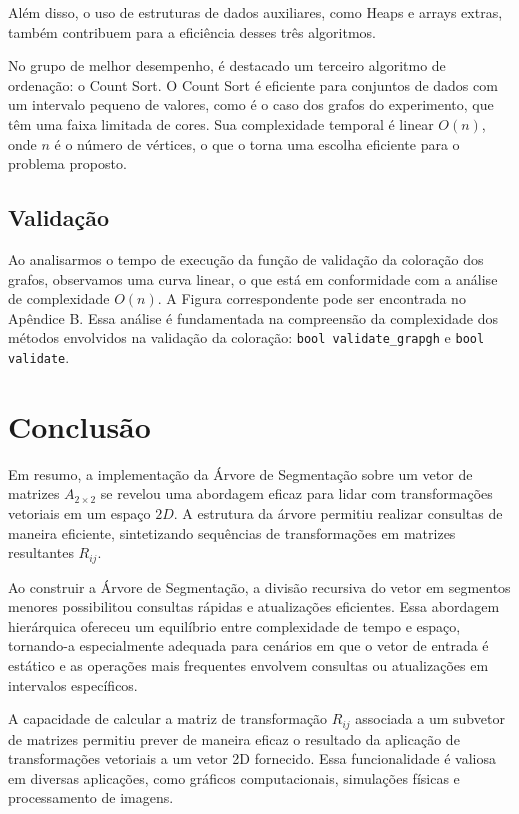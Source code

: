 \documentclass{article}
\begin{document}
Além disso, o uso de estruturas de dados auxiliares, como Heaps e arrays extras, também contribuem para a eficiência desses três algoritmos.

No grupo de melhor desempenho, é destacado um terceiro algoritmo de ordenação: o Count Sort. O Count Sort é eficiente para conjuntos de dados com um intervalo pequeno de valores, como é o caso dos grafos do experimento, que têm uma faixa limitada de cores. Sua complexidade temporal é linear \(O(n)\), onde \(n\) é o número de vértices, o que o torna uma escolha eficiente para o problema proposto.


\subsection{Validação}

Ao analisarmos o tempo de execução da função de validação da coloração dos grafos, observamos uma curva linear, o que está em conformidade com a análise de complexidade \(O(n)\). A Figura correspondente pode ser encontrada no Apêndice B.
Essa análise é fundamentada na compreensão da complexidade dos métodos envolvidos na validação da coloração: \texttt{bool validate\_grapgh} e \texttt{bool validate}.




\section{Conclusão}

Em resumo, a implementação da Árvore de Segmentação sobre um vetor de matrizes \(A_{2 \times 2}\) se revelou uma abordagem eficaz para lidar com transformações vetoriais em um espaço \(2D\). A estrutura da árvore permitiu realizar consultas de maneira eficiente, sintetizando sequências de transformações em matrizes resultantes \(R_{ij}\).

Ao construir a Árvore de Segmentação, a divisão recursiva do vetor em segmentos menores possibilitou consultas rápidas e atualizações eficientes. Essa abordagem hierárquica ofereceu um equilíbrio entre complexidade de tempo e espaço, tornando-a especialmente adequada para cenários em que o vetor de entrada é estático e as operações mais frequentes envolvem consultas ou atualizações em intervalos específicos.

A capacidade de calcular a matriz de transformação \(R_{ij}\) associada a um subvetor de matrizes permitiu prever de maneira eficaz o resultado da aplicação de transformações vetoriais a um vetor 2D fornecido. Essa funcionalidade é valiosa em diversas aplicações, como gráficos computacionais, simulações físicas e processamento de imagens.
\end{document}
